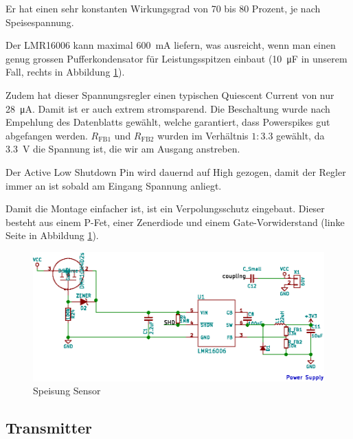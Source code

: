 Er  hat einen  sehr konstanten  Wirkungsgrad von  70 bis  80 Prozent,  je nach
Speisespannung.

Der  LMR16006 kann  maximal  \SI{600}{\milli\ampere}  liefern, was  ausreicht,
wenn  man   einen  genug  grossen  Pufferkondensator   f\"ur  Leistungsspitzen
einbaut   (\SI{10}{\micro\farad}  in   unserem  Fall,   rechts  in   Abbildung
\ref{fig:hw:sensor:speisung}).

Zudem  hat  dieser  Spannungsregler  einen  typischen  Quiescent  Current  von
nur  \SI{28}{\micro\ampere}. Damit  ist  er  auch  extrem  stromsparend.   Die
Beschaltung  wurde  nach   Empehlung  des  Datenblatts  \cite{ref:ti:lmr16006}
gew\"ahlt,  welche   garantiert,  dass  Powerspikes  gut   abgefangen  werden.
$R_{\mathrm{FB1}}$  und  $R_{\mathrm{FB2}}$  wurden  im  Verh\"altnis  $1:3.3$
gew\"ahlt, da \SI{3.3}{\volt} die Spannung ist, die wir am Ausgang anstreben.

Der Active  Low Shutdown Pin wird  dauernd auf High gezogen,  damit der Regler
immer an ist sobald am Eingang Spannung anliegt.

Damit die  Montage einfacher  ist, ist ein  Verpolungsschutz eingebaut. Dieser
besteht aus einem P-Fet, einer  Zenerdiode und einem Gate-Vorwiderstand (linke
Seite in Abbildung \ref{fig:hw:sensor:speisung}).

\vspace*{2em}

\begin{figure}[h!t]
    \centering
    \includegraphics[width=1\textwidth]{images/sensor-sch/sensor--sch--supply.eps}
    \caption[Sensor: Schema Speisung]{Speisung Sensor}
    \label{fig:hw:sensor:speisung}
\end{figure}


\clearpage
\subsection{Transmitter}
\label{subsec:hw:sensor:transmitter}

